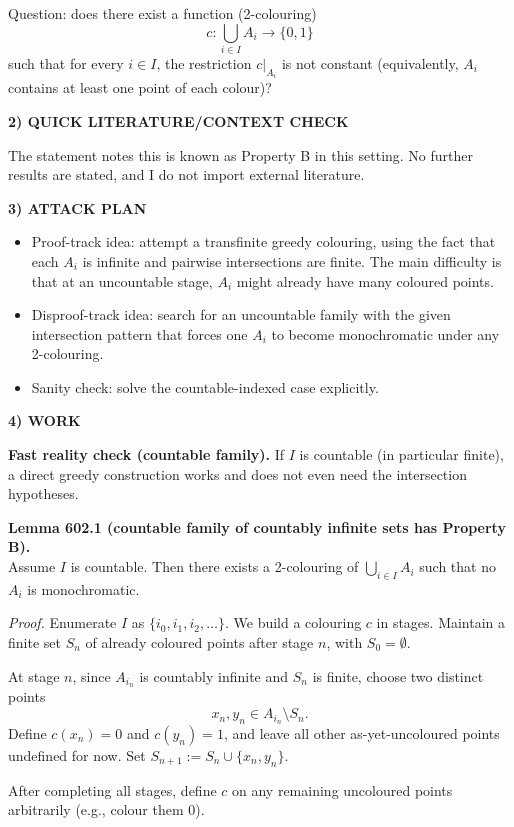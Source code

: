 Question: does there exist a function (2-colouring)
\[
 c: \bigcup_{i\in I} A_i \to \{0,1\}
\]
such that for every $i\in I$, the restriction $c|_{A_i}$ is not constant (equivalently, $A_i$ contains at least one point of each colour)?

\noindent\textbf{2) QUICK LITERATURE/CONTEXT CHECK}\par
The statement notes this is known as Property B in this setting. No further results are stated, and I do not import external literature.

\noindent\textbf{3) ATTACK PLAN}\par
\begin{itemize}
\item Proof-track idea: attempt a transfinite greedy colouring, using the fact that each $A_i$ is infinite and pairwise intersections are finite. The main difficulty is that at an uncountable stage, $A_i$ might already have many coloured points.
\item Disproof-track idea: search for an uncountable family with the given intersection pattern that forces one $A_i$ to become monochromatic under any 2-colouring.
\item Sanity check: solve the countable-indexed case explicitly.
\end{itemize}

\noindent\textbf{4) WORK}\par
\textbf{Fast reality check (countable family).} If $I$ is countable (in particular finite), a direct greedy construction works and does not even need the intersection hypotheses.

\medskip
\noindent\textbf{Lemma 602.1 (countable family of countably infinite sets has Property B).}\\
Assume $I$ is countable. Then there exists a 2-colouring of $\bigcup_{i\in I}A_i$ such that no $A_i$ is monochromatic.

\noindent\emph{Proof.}
Enumerate $I$ as $\{i_0,i_1,i_2,\dots\}$.
We build a colouring $c$ in stages. Maintain a finite set $S_n$ of already coloured points after stage $n$, with $S_0=\emptyset$.

At stage $n$, since $A_{i_n}$ is countably infinite and $S_n$ is finite, choose two distinct points
\[
x_n, y_n \in A_{i_n}\setminus S_n.
\]
Define $c(x_n)=0$ and $c(y_n)=1$, and leave all other as-yet-uncoloured points undefined for now.
Set $S_{n+1}:=S_n\cup\{x_n,y_n\}$.

After completing all stages, define $c$ on any remaining uncoloured points arbitrarily (e.g., colour them $0$).

